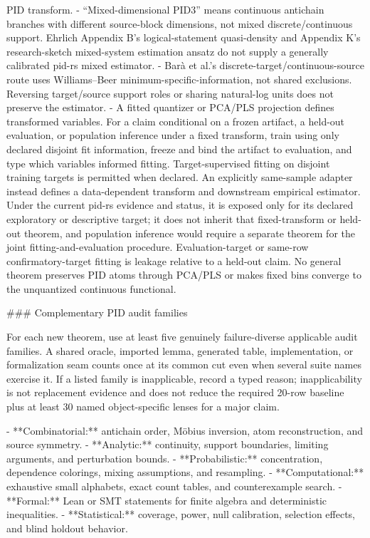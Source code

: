 \documentclass[11pt]{article}
\begin{document}
\begin{markdown}
  PID transform.
- “Mixed-dimensional PID3” means continuous antichain branches with different source-block
  dimensions, not mixed discrete/continuous support. Ehrlich Appendix B's logical-statement
  quasi-density and Appendix K's research-sketch mixed-system estimation ansatz do not supply a
  generally calibrated pid-rs mixed estimator.
- Barà et al.'s discrete-target/continuous-source route uses Williams--Beer
  minimum-specific-information, not shared exclusions. Reversing target/source support roles or
  sharing natural-log units does not preserve the estimator.
- A fitted quantizer or PCA/PLS projection defines transformed variables. For a claim conditional
  on a frozen artifact, a held-out evaluation, or population inference under a fixed transform,
  train using only declared disjoint fit information, freeze and bind the artifact to evaluation,
  and type which variables informed fitting. Target-supervised fitting on disjoint training targets
  is permitted when declared. An explicitly same-sample adapter instead defines a data-dependent
  transform and downstream empirical estimator. Under the current pid-rs evidence and status, it
  is exposed only for its declared exploratory or descriptive target; it does not inherit that
  fixed-transform or held-out theorem, and population inference would require a separate theorem
  for the joint fitting-and-evaluation procedure. Evaluation-target or same-row confirmatory-target
  fitting is leakage relative to a held-out claim. No general
  theorem preserves PID atoms through PCA/PLS or makes fixed bins converge to the unquantized
  continuous functional.

### Complementary PID audit families

For each new theorem, use at least five genuinely failure-diverse applicable audit families. A
shared oracle, imported lemma, generated table, implementation, or formalization seam counts once
at its common cut even when several suite names exercise it. If a listed family is inapplicable,
record a typed reason; inapplicability is not replacement evidence and does not reduce the required
20-row baseline plus at least 30 named object-specific lenses for a major claim.

- **Combinatorial:** antichain order, Möbius inversion, atom reconstruction, and source symmetry.
- **Analytic:** continuity, support boundaries, limiting arguments, and perturbation bounds.
- **Probabilistic:** concentration, dependence colorings, mixing assumptions, and resampling.
- **Computational:** exhaustive small alphabets, exact count tables, and counterexample search.
- **Formal:** Lean or SMT statements for finite algebra and deterministic inequalities.
- **Statistical:** coverage, power, null calibration, selection effects, and blind holdout behavior.


\end{markdown}
\end{document}

